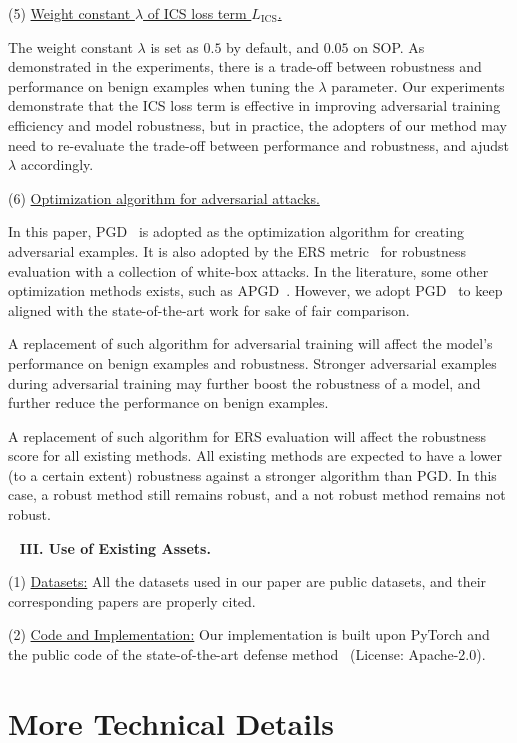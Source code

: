 (5) \ul{Weight constant $\lambda$ of ICS loss term $L_\text{ICS}$.}

The weight constant $\lambda$ is set as $0.5$ by default, and $0.05$ on SOP.
%
As demonstrated in the experiments, there is a trade-off between robustness and
performance on benign examples when tuning the $\lambda$ parameter.
%
Our experiments demonstrate that the ICS loss term is effective in improving
adversarial training efficiency and model robustness, but in practice, the
adopters of our method may need to re-evaluate the trade-off between
performance and robustness, and ajudst $\lambda$ accordingly.

(6) \ul{Optimization algorithm for adversarial attacks.}

In this paper, PGD~\cite{madry} is adopted as the optimization algorithm for
creating adversarial examples.
%
It is also adopted by the ERS metric~\cite{robrank} for robustness evaluation
with a collection of white-box attacks.
%
In the literature, some other optimization methods exists, such as
APGD~\cite{apgd}.
%
However, we adopt PGD~\cite{madry} to keep aligned with the state-of-the-art
work for sake of fair comparison.

A replacement of such algorithm for adversarial training will affect the
model's performance on benign examples and robustness.
%
Stronger adversarial examples during adversarial training may further boost the
robustness of a model, and further reduce the performance on benign examples.

A replacement of such algorithm for ERS evaluation will affect the robustness
score for all existing methods.
%
All existing methods are expected to have a lower (to a certain extent)
robustness against a stronger algorithm than PGD.
%
In this case, a robust method still remains robust, and a not robust method
remains not robust.

~\newline
\noindent\textbf{III. Use of Existing Assets.}

(1) \ul{Datasets:} All the datasets used in our paper are public datasets,
and their corresponding papers are properly cited.

(2) \ul{Code and Implementation:} Our implementation is built upon PyTorch
and the public code of the state-of-the-art defense method~\cite{robrank}
(License: Apache-2.0).

\section{More Technical Details}
\label{sec:b}

